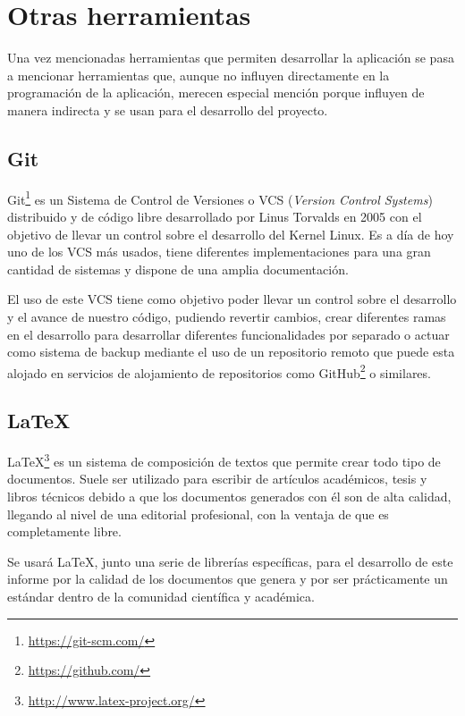 
\section{Otras herramientas}

Una vez mencionadas herramientas que permiten desarrollar la aplicación se pasa a mencionar herramientas que, aunque no influyen directamente en la programación de la aplicación, merecen especial mención porque influyen de manera indirecta y se usan para el desarrollo del proyecto.

\subsection{Git}

Git\footnote{\url{https://git-scm.com/}} es un Sistema de Control de Versiones o VCS (\textit{Version Control Systems}) distribuido y de código libre desarrollado por Linus Torvalds en 2005 con el objetivo de llevar un control sobre el desarrollo del Kernel Linux. Es a día de hoy uno de los VCS más usados, tiene diferentes implementaciones para una gran cantidad de sistemas y dispone de una amplia documentación. 

El uso de este VCS tiene como objetivo poder llevar un control sobre el desarrollo y el avance de nuestro código, pudiendo revertir cambios, crear diferentes ramas en el desarrollo para desarrollar diferentes funcionalidades por separado o actuar como sistema de backup mediante el uso de un repositorio remoto que puede esta alojado en servicios de alojamiento de repositorios como GitHub\footnote{\url{https://github.com/}} o similares.

\subsection{\LaTeX}

LaTeX\footnote{\url{http://www.latex-project.org/}}  es un sistema de composición de textos que permite crear todo tipo de documentos. Suele ser utilizado para escribir de artículos académicos, tesis y libros técnicos debido a que los documentos generados con él son de alta calidad, llegando al nivel de una editorial profesional, con la ventaja de que es completamente libre.

Se usará LaTeX, junto una serie de librerías específicas, para el desarrollo de este informe por la calidad de los documentos que genera y por ser prácticamente un estándar dentro de la comunidad científica y académica. 